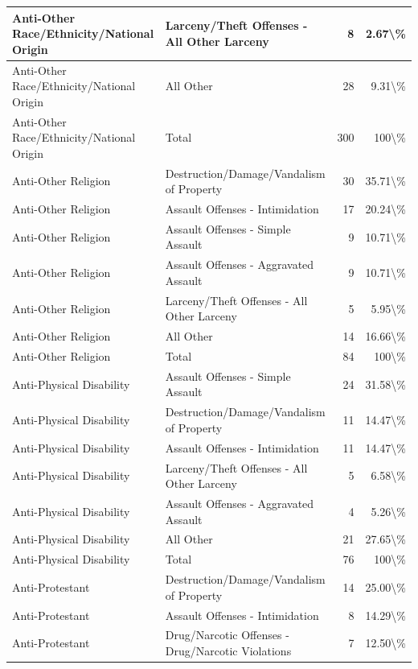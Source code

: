 \documentclass[
]{krantz}
\begin{document}
\begin{longtable}[t]{l|l|r|r}
\hline
Anti-Other Race/Ethnicity/National Origin & Larceny/Theft Offenses - All Other Larceny & 8 & 2.67\textbackslash{}\%\\
\hline
Anti-Other Race/Ethnicity/National Origin & All Other & 28 & 9.31\textbackslash{}\%\\
\hline
Anti-Other Race/Ethnicity/National Origin & Total & 300 & 100\textbackslash{}\%\\
\hline
Anti-Other Religion & Destruction/Damage/Vandalism of Property & 30 & 35.71\textbackslash{}\%\\
\hline
Anti-Other Religion & Assault Offenses - Intimidation & 17 & 20.24\textbackslash{}\%\\
\hline
Anti-Other Religion & Assault Offenses - Simple Assault & 9 & 10.71\textbackslash{}\%\\
\hline
Anti-Other Religion & Assault Offenses - Aggravated Assault & 9 & 10.71\textbackslash{}\%\\
\hline
Anti-Other Religion & Larceny/Theft Offenses - All Other Larceny & 5 & 5.95\textbackslash{}\%\\
\hline
Anti-Other Religion & All Other & 14 & 16.66\textbackslash{}\%\\
\hline
Anti-Other Religion & Total & 84 & 100\textbackslash{}\%\\
\hline
Anti-Physical Disability & Assault Offenses - Simple Assault & 24 & 31.58\textbackslash{}\%\\
\hline
Anti-Physical Disability & Destruction/Damage/Vandalism of Property & 11 & 14.47\textbackslash{}\%\\
\hline
Anti-Physical Disability & Assault Offenses - Intimidation & 11 & 14.47\textbackslash{}\%\\
\hline
Anti-Physical Disability & Larceny/Theft Offenses - All Other Larceny & 5 & 6.58\textbackslash{}\%\\
\hline
Anti-Physical Disability & Assault Offenses - Aggravated Assault & 4 & 5.26\textbackslash{}\%\\
\hline
Anti-Physical Disability & All Other & 21 & 27.65\textbackslash{}\%\\
\hline
Anti-Physical Disability & Total & 76 & 100\textbackslash{}\%\\
\hline
Anti-Protestant & Destruction/Damage/Vandalism of Property & 14 & 25.00\textbackslash{}\%\\
\hline
Anti-Protestant & Assault Offenses - Intimidation & 8 & 14.29\textbackslash{}\%\\
\hline
Anti-Protestant & Drug/Narcotic Offenses - Drug/Narcotic Violations & 7 & 12.50\textbackslash{}\%\\

\end{longtable}
\end{document}
